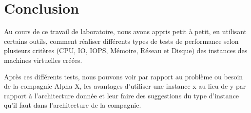 \chapter{Conclusion}

Au cours de ce travail de laboratoire, nous avons appris petit à petit, en utilisant certains outils,  comment réaliser différents types de tests de performance selon plusieurs critères (CPU, IO, IOPS, Mémoire, Réseau et Disque) des instances des machines virtuelles créées. 

Après ces différents tests, nous pouvons voir par rapport au problème ou besoin de la compagnie Alpha X, les avantages d’utiliser une instance x au lieu de y par rapport à l’architecture donnée et leur faire des suggestions du type d’instance qu’il faut dans l’architecture de la compagnie.